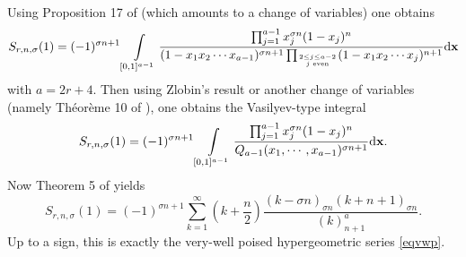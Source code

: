 \documentclass[reqno,12pt]{amsart}
\numberwithin{equation}{section}
\theoremstyle{remark}
\def\dd{\textup{d}}
\begin{document}
Using Proposition 17 of \cite{fischler2}  (which amounts to a change of variables) one obtains
$$S_{r,n,\sigma}(1) = (-1)^{\sigma n+1}  \int\limits_{[0,1]^{a-1}} \frac{\prod_{j=1}^{a-1} x_j^{\sigma n} 
(1-x_j)^n }{(1-x_1x_2\cdots x_{a-1})^{\sigma n+1} \prod_{2 \leq j \leq a-2 \atop j {\tiny \mbox{ even}}} 
(1-x_1x_2\cdots x_j)^{n+1}} \dd{\bf x}$$
with $a=2r+4$.
Then using Zlobin's result \cite{zlobin} or another change of variables 
(namely Th\'eor\`eme 10 of \cite{fischler2}), one obtains the Vasilyev-type integral 
$$S_{r,n,\sigma}(1) = (-1)^{\sigma n+1}  \int\limits_{[0,1]^{a-1}} \frac{\prod_{j=1}^{a-1} x_j^{\sigma n} (1-x_j)^n
 }{ Q_{a-1}(x_1,\cdots,x_{a-1})^{\sigma n+1} }  \dd{\bf x}.$$
Now Theorem 5 of \cite{zudilin} yields
$$S_{r,n,\sigma}(1) = (-1)^{\sigma n+1} \sum_{k=1}^{\infty} (k+\frac{n}2) \frac{(k-\sigma n)_{\sigma n} (k+n+1) _{\sigma n}}{(k)_{n+1}^a}.
$$
Up to a sign, this is exactly the very-well poised hypergeometric series \eqref{eqvwp}.




\def\refname{Bibliography} 
\end{document}
